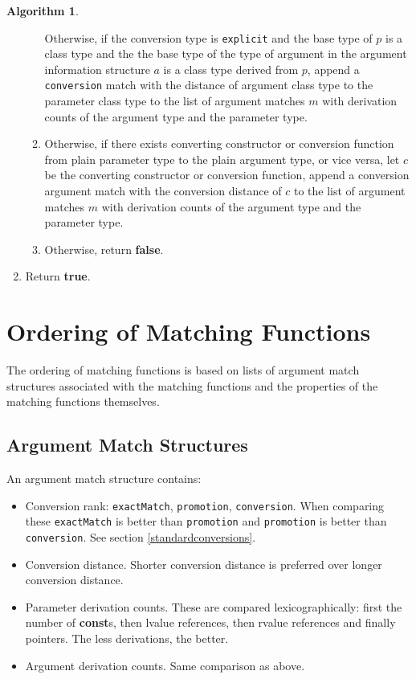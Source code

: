\documentclass[a4paper,oneside,11pt]{book}
\theoremstyle{definition}
\newtheorem{algo}{Algorithm}[section]
\begin{document}
\begin{algo}
\begin{enumerate}
\begin{enumerate}
Otherwise, if the conversion type is \verb|explicit| and the base type of $p$ is a class type and the
the base type of the type of argument in the argument information structure $a$ is a class type derived from $p$,
append a \verb|conversion| match with the distance of argument class type to the parameter class type to the list of argument matches $m$
with derivation counts of the argument type and the parameter type.
\item
Otherwise, if there exists converting constructor or conversion function from plain parameter type to the plain argument type, or vice versa,
let $c$ be the converting constructor or conversion function, append a conversion argument match with the conversion distance of $c$
to the list of argument matches $m$ with derivation counts of the argument type and the parameter type.
\item
Otherwise, return \textbf{false}.
\end{enumerate}
\item
Return \textbf{true}.
\end{enumerate}
\end{algo}

\section{Ordering of Matching Functions}\label{overloadordering}

The ordering of matching functions is based on lists of argument match structures associated with the matching functions and the properties of the matching
functions themselves.

\subsection{Argument Match Structures}

An argument match structure contains:
\begin{itemize}
\item
Conversion rank: \verb|exactMatch|, \verb|promotion|, \verb|conversion|.
When comparing these \verb|exactMatch| is better than \verb|promotion| and \verb|promotion| is better than \verb|conversion|.
See section \ref{standardconversions}.
\item
Conversion distance. Shorter conversion distance is preferred over longer conversion distance.
\item
Parameter derivation counts.
These are compared lexicographically: first the number of \textbf{const}s, then lvalue references, then rvalue references and finally pointers.
The less derivations, the better.
\item
Argument derivation counts. Same comparison as above.
\end{itemize}
\end{document}
